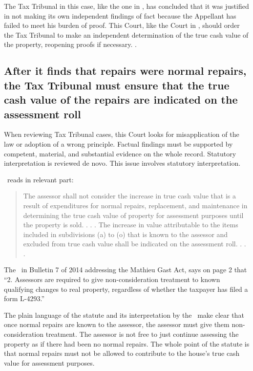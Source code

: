 \documentclass[12pt,\documentclassflag]{michiganCourtOfAppealsBrief}
\def\mathieuGast{\pincite[l]{MCL}{211.27(2)}}
\begin{document}
The Tax Tribunal in this case, like the one in \cite[s]{Jones & Laughlin}, has concluded that it was justified in not making its own independent findings of fact because the Appellant has failed to meet his burden of proof. This Court, like the Court in \cite[s]{Jones & Laughlin}, should order the Tax Tribunal to make an independent determination of the true cash value of the property, reopening proofs if necessary. .

\subsection{After it finds that repairs were normal repairs, the Tax Tribunal must ensure that the true cash value of the repairs are indicated on the assessment roll}

When reviewing Tax Tribunal cases, this Court looks for misapplication of the law or adoption of a wrong principle. Factual findings must be supported by competent, material, and substantial evidence on the whole record. Statutory interpretation is reviewed de novo.  This issue involves statutory interpretation.

\mathieuGast\ reads in relevant part:

\begin{quote}
	The assessor shall not consider the increase in true cash value that is a result of expenditures for normal repairs, replacement, and maintenance in determining the true cash value of property for assessment purposes until the property is sold. . . . The increase in value attributable to the items included in subdivisions (a) to (o) that is known to the assessor and excluded from true cash value shall be indicated on the assessment roll. . . .
\end{quote}

The \STC\ in Bulletin 7 of 2014 addressing the Mathieu Gast Act, says on page 2 that ``2. Assessors are required to give non-consideration treatment to known qualifying changes to real property, regardless of whether the taxpayer has filed a form L-4293.''

The plain language of the statute and its interpretation by the \STC\ make clear that once normal repairs are known to the assessor, the assessor must give them non-consideration treatment. The assessor is not free to just continue assessing the property as if there had been no normal repairs. The whole point of the statute is that normal repairs must not be allowed to contribute to the house's true cash value for assessment purposes.
\end{document}
